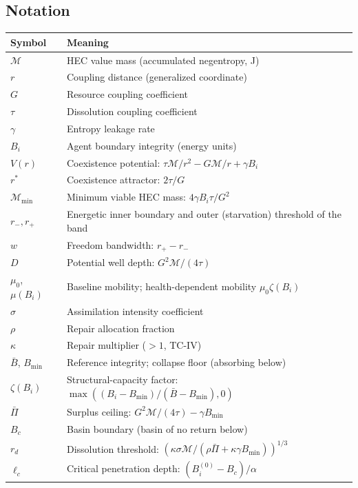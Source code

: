 \documentclass[11pt]{article}
\newcounter{none}
\begin{document}
\subsection{Notation}\label{notation}

{\def\LTcaptype{none} %
\begin{longtable}[]{@{}
  >{\raggedright\arraybackslash}p{}
  >{\raggedright\arraybackslash}p{}@{}}
\toprule\noalign{}
\begin{minipage}[b]{\linewidth}\raggedright
Symbol
\end{minipage} & \begin{minipage}[b]{\linewidth}\raggedright
Meaning
\end{minipage} \\
\midrule\noalign{}
\endhead
\bottomrule\noalign{}
\endlastfoot
\(\mathcal{M}\) & HEC value mass (accumulated negentropy, J) \\
\(r\) & Coupling distance (generalized coordinate) \\
\(G\) & Resource coupling coefficient \\
\(\tau\) & Dissolution coupling coefficient \\
\(\gamma\) & Entropy leakage rate \\
\(B_i\) & Agent boundary integrity (energy units) \\
\(V(r)\) & Coexistence potential:
\(\tau\mathcal{M}/r^2 - G\mathcal{M}/r + \gamma B_i\) \\
\(r^*\) & Coexistence attractor: \(2\tau/G\) \\
\(\mathcal{M}_{\min}\) & Minimum viable HEC mass:
\(4\gamma B_i \tau / G^2\) \\
\(r_-, r_+\) & Energetic inner boundary and outer (starvation) threshold
of the band \\
\(w\) & Freedom bandwidth: \(r_+ - r_-\) \\
\(D\) & Potential well depth: \(G^2\mathcal{M}/(4\tau)\) \\
\(\mu_0\), \(\mu(B_i)\) & Baseline mobility; health-dependent mobility
\(\mu_0\zeta(B_i)\) \\
\(\sigma\) & Assimilation intensity coefficient \\
\(\rho\) & Repair allocation fraction \\
\(\kappa\) & Repair multiplier (\(> 1\), TC-IV) \\
\(\bar{B}\), \(B_{\min}\) & Reference integrity; collapse floor
(absorbing below) \\
\(\zeta(B_i)\) & Structural-capacity factor:
\(\max((B_i - B_{\min})/(\bar{B} - B_{\min}), 0)\) \\
\(\bar{\Pi}\) & Surplus ceiling:
\(G^2\mathcal{M}/(4\tau) - \gamma B_{\min}\) \\
\(B_c\) & Basin boundary (basin of no return below) \\
\(r_d\) & Dissolution threshold:
\((\kappa\sigma\mathcal{M}/(\rho\bar{\Pi} + \kappa\gamma B_{\min}))^{1/3}\) \\
\(\ell_c\) & Critical penetration depth: \((B_i^{(0)} - B_c)/\alpha\) \\
\end{longtable}
}
\end{document}

